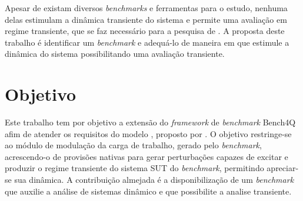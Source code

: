 Apesar de existam diversos \textit{benchmarks} e ferramentas para o estudo, nenhuma delas estimulam a dinâmica transiente do sistema e permite uma avaliação em regime transiente, que se faz necessário para a pesquisa de . A proposta deste trabalho é identificar um \textit{benchmark} e adequá-lo de maneira em que estimule a dinâmica do sistema possibilitando uma avaliação transiente.


\section{Objetivo}
Este trabalho tem por objetivo a extensão do \textit{framework} de \textit{benchmark} Bench4Q afim de atender os requisitos do modelo \textit{}, proposto por . O objetivo restringe-se ao módulo de modulação da carga de trabalho, gerado pelo \textit{benchmark}, acrescendo-o de provisões nativas para gerar perturbações capazes de excitar e produzir o regime transiente do sistema SUT do \textit{benchmark}, permitindo apreciar-se sua dinâmica. A contribuição almejada é a disponibilização de um \textit{benchmark} que auxilie a análise de sistemas dinâmico e que possibilite a analise transiente.

